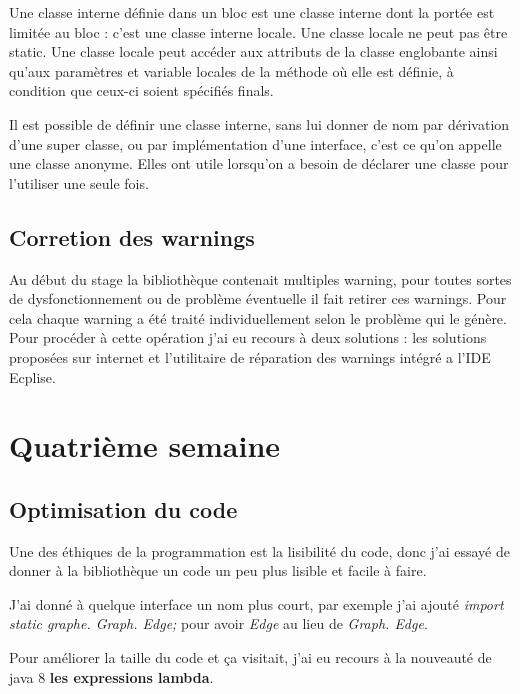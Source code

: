 \documentclass[12pt]{report}
\begin{document}
Une classe interne définie dans un bloc est une classe interne dont la portée est limitée au bloc : c’est une classe interne locale. Une classe locale ne peut pas être static. Une classe locale peut accéder aux attributs de la classe englobante ainsi qu'aux paramètres et variable locales de la méthode où elle est définie, à condition que ceux-ci soient spécifiés finals.\newline 

Il est possible de définir une classe interne, sans lui donner de nom par dérivation d'une super classe, ou par implémentation d’une interface, c'est ce qu'on appelle une classe anonyme. Elles ont utile lorsqu'on a besoin de déclarer une classe pour l'utiliser une seule fois.\newline


\subsection{Corretion des warnings}

Au début du stage la bibliothèque contenait multiples warning, pour toutes sortes de dysfonctionnement ou de problème éventuelle il fait retirer ces warnings. Pour cela chaque warning a été traité individuellement selon le problème qui le génère. Pour procéder à cette opération j'ai eu recours à deux solutions : les solutions proposées sur internet et l'utilitaire de réparation des warnings intégré a l'IDE Ecplise.
~\\

\section{Quatrième semaine}

\subsection{Optimisation du code}

Une des éthiques de la programmation est la lisibilité du code, donc j'ai essayé de donner à la bibliothèque un code un peu plus lisible et facile à faire. \newline

J'ai donné à quelque interface un nom plus court, par exemple j'ai ajouté \textit{import static graphe. Graph. Edge;} pour avoir \textit{Edge} au lieu de \textit{Graph. Edge}.\newline

Pour améliorer la taille du code et ça visitait, j'ai eu recours à la nouveauté de java 8 \textbf{les expressions lambda}.
\end{document}
